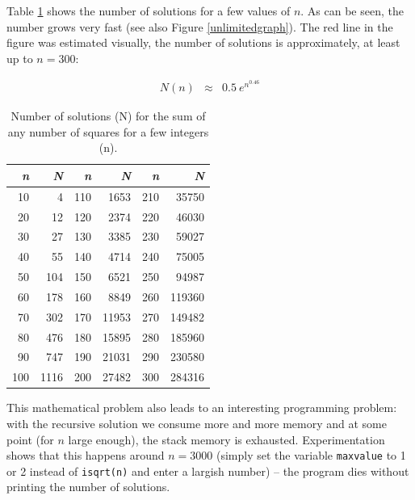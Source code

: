 \documentclass[onecolumn]{article}
\begin{document}
Table \ref{unlimitedsum} shows the number of solutions for a few values of $n$. As can be seen, the number
grows very fast (see also Figure \ref{unlimitedgraph}). The red line in the figure was estimated visually, the
number of solutions is approximately, at least up to $n = 300$:

\begin{eqnarray*}
    N(n) &\approx& 0.5~ e^{n^{0.46}}
\end{eqnarray*}

\begin{table}
\begin{center}
\caption{Number of solutions (N) for the sum of any number of squares for a few integers (n).}
\label{unlimitedsum}
\begin{tabular}{rr|rr|rr}
\emph{n} & \emph{N}         & \emph{n} & \emph{N}    & \emph{n}    & \emph{N}    \\
\hline
10       &         4        & 110      &    1653     &    210      &  35750      \\
20       &         12       & 120      &    2374     &    220      &  46030      \\
30       &         27       & 130      &    3385     &    230      &  59027      \\
40       &         55       & 140      &    4714     &    240      &  75005      \\
50       &         104      & 150      &    6521     &    250      &  94987      \\
60       &         178      & 160      &    8849     &    260      &  119360     \\
70       &         302      & 170      &    11953    &    270      &  149482     \\
80       &         476      & 180      &    15895    &    280      &  185960     \\
90       &         747      & 190      &    21031    &    290      &  230580     \\
100      &         1116     & 200      &    27482    &    300      &  284316     \\
\hline
\end{tabular}
\end{center}
\end{table}

This mathematical problem also leads to an interesting programming problem: with the recursive
solution we consume more and more memory and at some point (for $n$ large enough), the stack memory
is exhausted. Experimentation shows that this happens around $n = 3000$ (simply set the variable
\verb+maxvalue+ to 1 or 2 instead of \verb+isqrt(n)+ and enter a largish number) -- the program dies
without printing the number of solutions.
\end{document}
